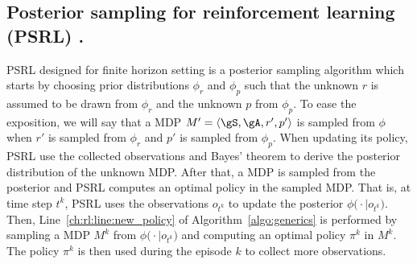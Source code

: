 \subsection{Posterior sampling for reinforcement learning (PSRL) \texorpdfstring{\cite{osband2013more}}{[ORV13]}.}

PSRL designed for finite horizon setting is a posterior sampling algorithm which starts by choosing prior distributions $\phi_r$ and $\phi_p$ such that the unknown $r$ is assumed to be drawn from $\phi_r$ and the unknown $p$ from $\phi_p$.
To ease the exposition, we will say that a MDP $M'=\langle\gS,\gA,r',p'\rangle$ is sampled from $\phi$ when $r'$ is sampled from $\phi_r$ and $p'$ is sampled from $\phi_p$.
When updating its policy, PSRL use the collected observations and Bayes' theorem to derive the posterior distribution of the unknown MDP.
After that, a MDP is sampled from the posterior and PSRL computes an optimal policy in the sampled MDP.
That is, at time step $t^k$, PSRL uses the observations $o_{t^k}$ to update the posterior $\phi\bigl(\cdot\mid o_{t^k}\bigr)$.
Then, Line~\ref{ch:rl:line:new_policy} of Algorithm~\ref{algo:generics} is performed by sampling a MDP $M^k$ from $\phi\bigl(\cdot\mid o_{t^k}\bigr)$ and computing an optimal policy $\pi^k$ in $M^k$.
The policy $\pi^k$ is then used during the episode $k$ to collect more observations.

